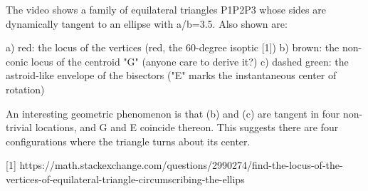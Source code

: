 The video shows a family of equilateral triangles P1P2P3 whose sides are dynamically tangent to an ellipse with a/b=3.5. Also shown are:

a) red: the locus of the vertices (red, the 60-degree isoptic [1])
b) brown: the non-conic locus of the centroid "G" (anyone care to derive it?)
c) dashed green: the astroid-like envelope of the bisectors ("E" marks the instantaneous center of rotation)

An interesting geometric phenomenon is that (b) and (c) are tangent in four non-trivial locations, and G and E coincide thereon. This suggests there are four configurations where the triangle turns about its center.

[1] https://math.stackexchange.com/questions/2990274/find-the-locus-of-the-vertices-of-equilateral-triangle-circumscribing-the-ellips